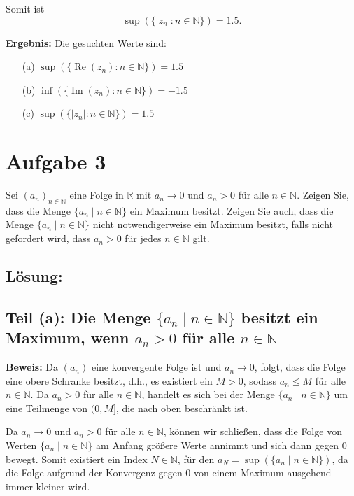 \documentclass[11pt]{article}
\begin{document}
Somit ist
\[
\sup(\{|z_n| : n \in \mathbb{N}\}) = 1.5.
\]

\textbf{Ergebnis:} Die gesuchten Werte sind:
\begin{enumerate}
    \item[(a)] \( \sup(\{\operatorname{Re}(z_n) : n \in \mathbb{N}\}) = 1.5 \)
    \item[(b)] \( \inf(\{\operatorname{Im}(z_n) : n \in \mathbb{N}\}) = -1.5 \)
    \item[(c)] \( \sup(\{|z_n| : n \in \mathbb{N}\}) = 1.5 \)
\end{enumerate}

\section*{Aufgabe 3}

Sei \( (a_n)_{n \in \mathbb{N}} \) eine Folge in \( \mathbb{R} \) mit \( a_n \to 0 \) und \( a_n > 0 \) für alle \( n \in \mathbb{N} \). Zeigen Sie, dass die Menge \( \{a_n \mid n \in \mathbb{N}\} \) ein Maximum besitzt. Zeigen Sie auch, dass die Menge \( \{a_n \mid n \in \mathbb{N}\} \) nicht notwendigerweise ein Maximum besitzt, falls nicht gefordert wird, dass \( a_n > 0 \) für jedes \( n \in \mathbb{N} \) gilt.

\subsection*{Lösung:}

\subsection*{Teil (a): Die Menge \( \{a_n \mid n \in \mathbb{N}\} \) besitzt ein Maximum, wenn \( a_n > 0 \) für alle \( n \in \mathbb{N} \)}

\textbf{Beweis:}
Da \( (a_n) \) eine konvergente Folge ist und \( a_n \to 0 \), folgt, dass die Folge eine obere Schranke besitzt, d.h., es existiert ein \( M > 0 \), sodass \( a_n \leq M \) für alle \( n \in \mathbb{N} \). Da \( a_n > 0 \) für alle \( n \in \mathbb{N} \), handelt es sich bei der Menge \( \{a_n \mid n \in \mathbb{N}\} \) um eine Teilmenge von \( (0, M] \), die nach oben beschränkt ist.

Da \( a_n \to 0 \) und \( a_n > 0 \) für alle \( n \in \mathbb{N} \), können wir schließen, dass die Folge von Werten \( \{a_n \mid n \in \mathbb{N}\} \) am Anfang größere Werte annimmt und sich dann gegen 0 bewegt. Somit existiert ein Index \( N \in \mathbb{N} \), für den \( a_N = \sup(\{a_n \mid n \in \mathbb{N}\}) \), da die Folge aufgrund der Konvergenz gegen 0 von einem Maximum ausgehend immer kleiner wird.
\end{document}
